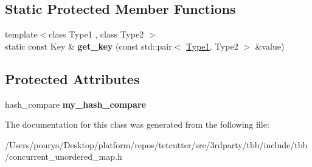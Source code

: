 \subsection*{Static Protected Member Functions}
\begin{DoxyCompactItemize}
\item 
\hypertarget{classtbb_1_1interface5_1_1concurrent__unordered__map__traits_a561f2cf05060387c8282ad57f5c816ca}{}{\footnotesize template$<$class Type1 , class Type2 $>$ }\\static const Key \& {\bfseries get\+\_\+key} (const std\+::pair$<$ \hyperlink{classType1}{Type1}, Type2 $>$ \&value)\label{classtbb_1_1interface5_1_1concurrent__unordered__map__traits_a561f2cf05060387c8282ad57f5c816ca}

\end{DoxyCompactItemize}
\subsection*{Protected Attributes}
\begin{DoxyCompactItemize}
\item 
\hypertarget{classtbb_1_1interface5_1_1concurrent__unordered__map__traits_ad8f108aa7fc21e9e38050a9d56e691b7}{}hash\+\_\+compare {\bfseries my\+\_\+hash\+\_\+compare}\label{classtbb_1_1interface5_1_1concurrent__unordered__map__traits_ad8f108aa7fc21e9e38050a9d56e691b7}

\end{DoxyCompactItemize}


The documentation for this class was generated from the following file\+:\begin{DoxyCompactItemize}
\item 
/\+Users/pourya/\+Desktop/platform/repos/tetcutter/src/3rdparty/tbb/include/tbb/concurrent\+\_\+unordered\+\_\+map.\+h\end{DoxyCompactItemize}
